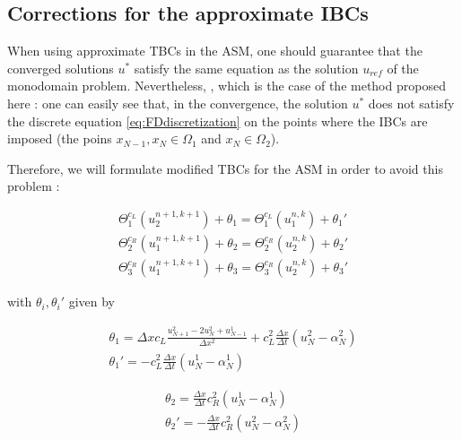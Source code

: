 \subsection{Corrections for the approximate IBCs}

\indent When using approximate TBCs in the ASM, one should guarantee that the converged solutions $u^*$ satisfy the same equation as the solution $u_{ref}$ of the monodomain problem. Nevertheless, \begingroup \color{red}{usually this property is not verified by DDMs} \endgroup, which is the case of the method proposed here : one can easily see that, in the convergence, the solution $u^*$ does not satisfy the discrete equation \eqref{eq:FDdiscretization} on the points where the IBCs are imposed (the poins $x_{N-1},x_N \in \Omega_1$ and $x_N \in \Omega_2$).

\indent Therefore, we will formulate modified TBCs for the ASM in order to avoid this problem  :

\begin{equation}
	\label{eq:correctedTBC}
    \begin{gathered}
        \Theta_1^{c_L}(u_2^{n+1,k+1}) + \theta_1 = \Theta_1^{c_L}(u_1^{n,k}) + \theta_1' \\
        \Theta_2^{c_R}(u_1^{n+1,k+1}) + \theta_2 = \Theta_2^{c_R}(u_2^{n,k}) + \theta_2' \\
        \Theta_3^{c_R}(u_1^{n+1,k+1}) + \theta_3 = \Theta_3^{c_R}(u_2^{n,k}) + \theta_3'
    \end{gathered}
\end{equation}

\noindent with $\theta_i, \theta_i'$ given by

\begin{gather*}
    \theta_1 = \Delta x c_L \frac{u_{N+1}^2 - 2u_{N}^2 + u_{N-1}^1}{\Delta x^2} + c_L^2\frac{\Delta x}{\Delta t} \left( u_{N}^2 - \alpha_{N}^2 \right)\\
    \theta_1' = - c_L^2\frac{\Delta x}{\Delta t} \left( u_{N}^1 - \alpha_{N}^1 \right)
\end{gather*}

\begin{equation*}
\begin{gathered}
    \theta_2 = \frac{\Delta x}{\Delta t} c_R^2 (u_N^1 - \alpha_N^1) \\
    \theta_2' = -\frac{\Delta x}{\Delta t} c_R^2 (u_N^2 - \alpha_N^2)
\end{gathered}
\end{equation*}

